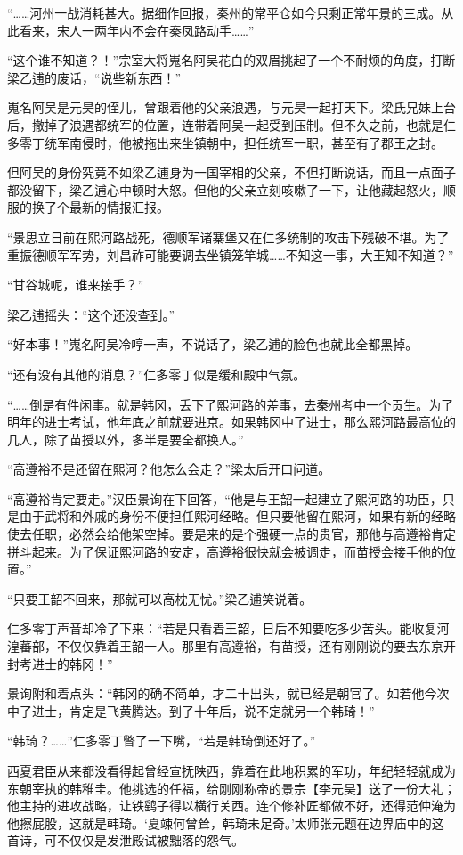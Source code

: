 “……河州一战消耗甚大。据细作回报，秦州的常平仓如今只剩正常年景的三成。从此看来，宋人一两年内不会在秦凤路动手……”

“这个谁不知道？！”宗室大将嵬名阿吴花白的双眉挑起了一个不耐烦的角度，打断梁乙逋的废话，“说些新东西！”

嵬名阿吴是元昊的侄儿，曾跟着他的父亲浪遇，与元昊一起打天下。梁氏兄妹上台后，撤掉了浪遇都统军的位置，连带着阿吴一起受到压制。但不久之前，也就是仁多零丁统军南侵时，他被拖出来坐镇朝中，担任统军一职，甚至有了郡王之封。

但阿吴的身份究竟不如梁乙逋身为一国宰相的父亲，不但打断说话，而且一点面子都没留下，梁乙逋心中顿时大怒。但他的父亲立刻咳嗽了一下，让他藏起怒火，顺服的换了个最新的情报汇报。

“景思立日前在熙河路战死，德顺军诸寨堡又在仁多统制的攻击下残破不堪。为了重振德顺军军势，刘昌祚可能要调去坐镇笼竿城……不知这一事，大王知不知道？”

“甘谷城呢，谁来接手？”

梁乙逋摇头：“这个还没查到。”

“好本事！”嵬名阿吴冷哼一声，不说话了，梁乙逋的脸色也就此全都黑掉。

“还有没有其他的消息？”仁多零丁似是缓和殿中气氛。

“……倒是有件闲事。就是韩冈，丢下了熙河路的差事，去秦州考中一个贡生。为了明年的进士考试，他年底之前就要进京。如果韩冈中了进士，那么熙河路最高位的几人，除了苗授以外，多半是要全都换人。”

“高遵裕不是还留在熙河？他怎么会走？”梁太后开口问道。

“高遵裕肯定要走。”汉臣景询在下回答，“他是与王韶一起建立了熙河路的功臣，只是由于武将和外戚的身份不便担任熙河经略。但只要他留在熙河，如果有新的经略使去任职，必然会给他架空掉。要是来的是个强硬一点的贵官，那他与高遵裕肯定拼斗起来。为了保证熙河路的安定，高遵裕很快就会被调走，而苗授会接手他的位置。”

“只要王韶不回来，那就可以高枕无忧。”梁乙逋笑说着。

仁多零丁声音却冷了下来：“若是只看着王韶，日后不知要吃多少苦头。能收复河湟蕃部，不仅仅靠着王韶一人。那里有高遵裕，有苗授，还有刚刚说的要去东京开封考进士的韩冈！”

景询附和着点头：“韩冈的确不简单，才二十出头，就已经是朝官了。如若他今次中了进士，肯定是飞黄腾达。到了十年后，说不定就另一个韩琦！”

“韩琦？……”仁多零丁瞥了一下嘴，“若是韩琦倒还好了。”

西夏君臣从来都没看得起曾经宣抚陕西，靠着在此地积累的军功，年纪轻轻就成为东朝宰执的韩稚圭。他挑选的任福，给刚刚称帝的景宗【李元昊】送了一份大礼；他主持的进攻战略，让铁鹞子得以横行关西。连个修补匠都做不好，还得范仲淹为他擦屁股，这就是韩琦。‘夏竦何曾耸，韩琦未足奇。’太师张元题在边界庙中的这首诗，可不仅仅是发泄殿试被黜落的怨气。

